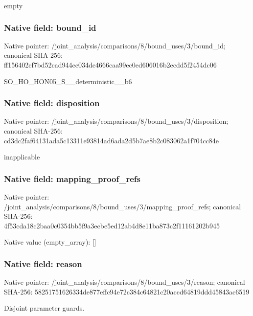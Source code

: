 \documentclass[10pt,a4paper]{article}
\begin{document}
\begingroup\raggedright\sloppy empty\par\endgroup

\subsubsection{Native field: bound\_\allowbreak{}id}
Native pointer: /joint\_\allowbreak{}analysis/comparisons/8/bound\_\allowbreak{}uses/3/bound\_\allowbreak{}id; canonical SHA-256: ff156402cf7bd52cad944cc034dc4666caa99ec0ed606016b2ecdd5f2454dc06

\begingroup\raggedright\sloppy SO\_\allowbreak{}HO\_\allowbreak{}HON05\_\allowbreak{}S\_\allowbreak{}\_\allowbreak{}deterministic\_\allowbreak{}\_\allowbreak{}b6\par\endgroup

\subsubsection{Native field: disposition}
Native pointer: /joint\_\allowbreak{}analysis/comparisons/8/bound\_\allowbreak{}uses/3/disposition; canonical SHA-256: cd3dc2faf64131ada5c13311e93814ad6ada2d5b7ae8b2c083062a1f704cc84e

\begingroup\raggedright\sloppy inapplicable\par\endgroup

\subsubsection{Native field: mapping\_\allowbreak{}proof\_\allowbreak{}refs}
Native pointer: /joint\_\allowbreak{}analysis/comparisons/8/bound\_\allowbreak{}uses/3/mapping\_\allowbreak{}proof\_\allowbreak{}refs; canonical SHA-256: 4f53cda18c2baa0c0354bb5f9a3ecbe5ed12ab4d8e11ba873c2f11161202b945

Native value (empty\_\allowbreak{}array): []

\subsubsection{Native field: reason}
Native pointer: /joint\_\allowbreak{}analysis/comparisons/8/bound\_\allowbreak{}uses/3/reason; canonical SHA-256: 58251751626334de877effc94e72c384c64821c20accd64819ddd45843ac6519

\begingroup\raggedright\sloppy Disjoint parameter guards.\par\endgroup
\end{document}
